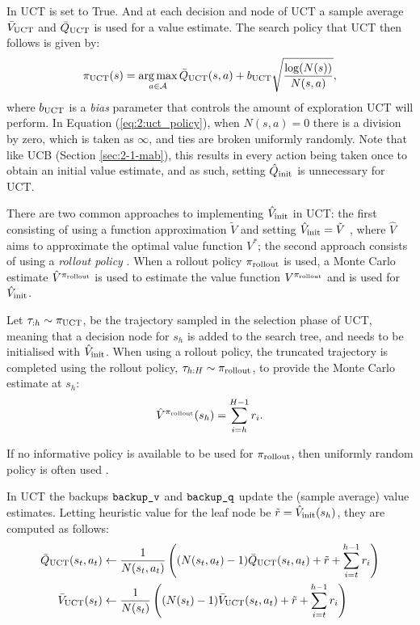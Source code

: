         In UCT \mctsmode\ewe is set to True. And at each decision and node of UCT a sample average ${\bar{V}_{{\textnormal{UCT}}}}$ and ${\bar{Q}_{{\textnormal{UCT}}}}$ is used for a value estimate. The search policy that UCT then follows is given by:
        \begin{align}
            {\pi_{{\textnormal{UCT}}}}(s) = \operatorname*{arg\,max}_{a\in\mathcal{A}} {\bar{Q}_{{\textnormal{UCT}}}}(s,a) + b_{{\textnormal{UCT}}} \sqrt{\frac{\log(N(s))}{N(s,a)}}, \label{eq:2:uct_policy}
        \end{align}
        where $b_{{\textnormal{UCT}}}$ is a \textit{bias} parameter that controls the amount of exploration UCT will perform. In Equation (\ref{eq:2:uct_policy}), when $N(s,a)=0$ there is a division by zero, which is taken as $\infty$, and ties are broken uniformly randomly. Note that like UCB (Section \ref{sec:2-1-mab}), this results in every action being taken once to obtain an initial value estimate, and as such, setting ${\hat{Q}_{\textnormal{init}}}$ is unnecessary for UCT.   
        
        There are two common approaches to implementing ${\hat{V}_{\textnormal{init}}}$ in UCT: the first consisting of using a function approximation $\tilde{V}$ and setting ${\hat{V}_{\textnormal{init}}}=\tilde{V}$ \cite{alpha_go_zero,alpha_zero,a0c} , where $\hat{V}$ aims to approximate the optimal value function $V^*$; the second approach consists of using a \textit{rollout policy} \cite{mcts_survey,rave,prost,bus}. When a rollout policy ${\pi_{{\textnormal{rollout}}}}$ is used, a Monte Carlo estimate $\hat{V}^{{\pi_{{\textnormal{rollout}}}}}$ is used to estimate the value function $V^{{\pi_{{\textnormal{rollout}}}}}$ and is used for ${\hat{V}_{\textnormal{init}}}$.

        Let $\tau_{:h}\sim{\pi_{{\textnormal{UCT}}}}$, be the trajectory sampled in the selection phase of UCT, meaning that a decision node for $s_h$ is added to the search tree, and needs to be initialised with ${\hat{V}_{\textnormal{init}}}$. When using a rollout policy, the truncated trajectory is completed using the rollout policy, $\tau_{h:H}\sim{\pi_{{\textnormal{rollout}}}}$, to provide the Monte Carlo estimate at $s_h$:
        \begin{align}
            \hat{V}^{{\pi_{{\textnormal{rollout}}}}}(s_h) = \sum_{i=h}^{H-1} r_i. \label{eq:2:rollout_value_estimate}
        \end{align}

        If no informative policy is available to be used for ${\pi_{{\textnormal{rollout}}}}$, then uniformly random policy is often used \cite{mcts_survey,rand_mc_est_orig}.

        In UCT the backups ${\textnormal{\texttt{backup\_v}}}$ and ${\textnormal{\texttt{backup\_q}}}$ update the (sample average) value estimates. Letting heuristic value for the leaf node be $\tilde{r} = {\hat{V}_{\textnormal{init}}}(s_h)$, they are computed as follows:
        \begin{align}
            {\bar{Q}_{{\textnormal{UCT}}}}(s_t,a_t) &\leftarrow 
                \frac{1}{N(s_t,a_t)} \left( (N(s_t,a_t)-1) {\bar{Q}_{{\textnormal{UCT}}}}(s_t,a_t) 
                    + \tilde{r} + \sum_{i=t}^{h-1} r_i \right) \label{eq:2:uct_backup_q} \\
            {\bar{V}_{{\textnormal{UCT}}}}(s_t) &\leftarrow 
                \frac{1}{N(s_t)} \left( (N(s_t)-1) {\bar{V}_{{\textnormal{UCT}}}}(s_t,a_t) 
                    + \tilde{r} + \sum_{i=t}^{h-1} r_i \right) \label{eq:2:uct_backup_v} 
        \end{align}  








